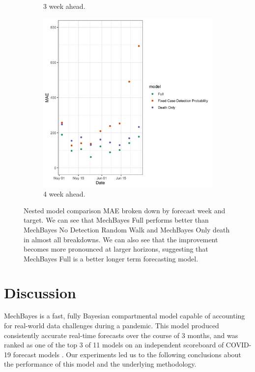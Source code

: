 \documentclass[11pt]{amsart}
\begin{document}
\begin{figure}
\begin{subfigure}{.5\textwidth}
    \caption{3 week ahead.}
\end{subfigure}%
\begin{subfigure}{.5\textwidth}
  \centering
    \includegraphics[scale=.15]{ablation_4.png}
    \caption{4 week ahead. }
\end{subfigure}

\caption{Nested model comparison MAE broken down by forecast week and target. We can see that MechBayes Full performs better than MechBayes No Detection Random Walk and MechBayes Only death in almost all breakdowns. We can also see that the improvement becomes more pronounced at larger horizons, suggesting that MechBayes Full is a better longer term forecasting model.  }
\label{fig:ablation}
\end{figure}




\section{Discussion}

MechBayes is a fast, fully Bayesian compartmental model capable of accounting for real-world data challenges during a pandemic.  This model produced consistently accurate real-time forecasts over the course of 3 months, and was ranked as one of the top 3 of 11 models on an independent scoreboard of COVID-19 forecast models \cite{yyg}. Our experiments led us to the following conclusions about the performance of this model and the underlying methodology.
\end{document}
